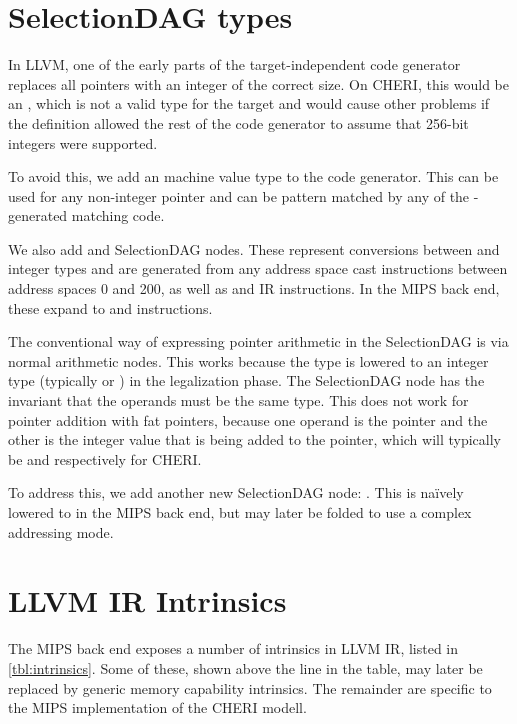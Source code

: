 \section{SelectionDAG types}

In LLVM, one of the early parts of the target-independent code generator replaces all pointers with an integer of the correct size.
On CHERI, this would be an , which is not a valid type for the target and would cause other problems if the definition allowed the rest of the code generator to assume that 256-bit integers were supported.

To avoid this, we add an  machine value type to the code generator.
This can be used for any non-integer pointer and can be pattern matched by any of the  -generated matching code.

We also add  and  SelectionDAG nodes.
These represent conversions between  and integer types and are generated from any address space cast instructions between address spaces 0 and 200, as well as  and  IR instructions.
In the MIPS back end, these expand to  and  instructions.

The conventional way of expressing pointer arithmetic in the SelectionDAG is via normal arithmetic nodes.
This works because the  type is lowered to an integer type (typically  or ) in the legalization phase.
The  SelectionDAG node has the invariant that the operands must be the same type.
This does not work for pointer addition with fat pointers, because one operand is the pointer and the other is the integer value that is being added to the pointer, which will typically be  and  respectively for CHERI.

To address this, we add another new SelectionDAG node: .
This is naïvely lowered to  in the MIPS back end, but may later be folded to use a complex addressing mode.

\section{LLVM IR Intrinsics}

The MIPS back end exposes a number of intrinsics in LLVM IR, listed in \autoref{tbl:intrinsics}.
Some of these, shown above the line in the table, may later be replaced by generic memory capability intrinsics.
The remainder are specific to the MIPS implementation of the CHERI modell.

